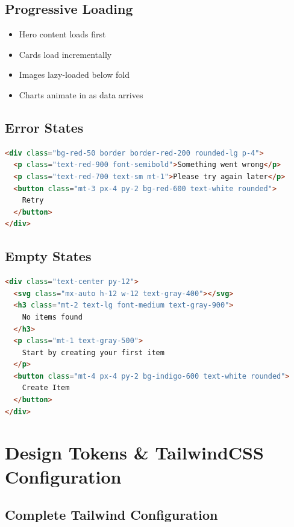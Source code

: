 \documentclass{report}
\begin{document}
\section{Progressive Loading}

\begin{itemize}
    \item Hero content loads first
    \item Cards load incrementally
    \item Images lazy-loaded below fold
    \item Charts animate in as data arrives
\end{itemize}

\section{Error States}

\begin{lstlisting}[language=HTML]
<div class="bg-red-50 border border-red-200 rounded-lg p-4">
  <p class="text-red-900 font-semibold">Something went wrong</p>
  <p class="text-red-700 text-sm mt-1">Please try again later</p>
  <button class="mt-3 px-4 py-2 bg-red-600 text-white rounded">
    Retry
  </button>
</div>
\end{lstlisting}

\section{Empty States}

\begin{lstlisting}[language=HTML]
<div class="text-center py-12">
  <svg class="mx-auto h-12 w-12 text-gray-400"></svg>
  <h3 class="mt-2 text-lg font-medium text-gray-900">
    No items found
  </h3>
  <p class="mt-1 text-gray-500">
    Start by creating your first item
  </p>
  <button class="mt-4 px-4 py-2 bg-indigo-600 text-white rounded">
    Create Item
  </button>
</div>
\end{lstlisting}

\chapter{Design Tokens \& TailwindCSS Configuration}

\section{Complete Tailwind Configuration}
\end{document}
